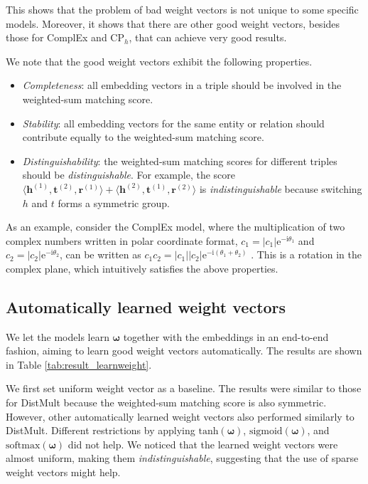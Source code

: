 \documentclass[sigconf,edbt]{acmart-edbt2019}
\def\vh{{\bm{h}}}
\def\vr{{\bm{r}}}
\def\vt{{\bm{t}}}
\begin{document}
This shows that the problem of bad weight vectors is not unique to some specific models. Moreover, it shows that there are other good weight vectors, besides those for ComplEx and CP$ _h $, that can achieve very good results.

We note that the good weight vectors exhibit the following properties.
\begin{itemize}
	\item \textit{Completeness}: all embedding vectors in a triple should be involved in the weighted-sum matching score.
	\item \textit{Stability}: all embedding vectors for the same entity or relation should contribute equally to the weighted-sum matching score.
	\item \textit{Distinguishability}: the weighted-sum matching scores for different triples should be \textit{distinguishable}. For example, the score $ \langle \vh^{(1)}, \vt^{(2)}, \vr^{(1)} \rangle + \langle \vh^{(2)}, \vt^{(1)}, \vr^{(2)} \rangle $ is \textit{indistinguishable} because switching $ h $ and $ t $ forms a symmetric group.
\end{itemize}

As an example, consider the ComplEx model, where the multiplication of two complex numbers written in polar coordinate format, $ c_1 = |c_1|\text{e}^{-\text{i}\theta_1} $ and $ c_2 = |c_2|\text{e}^{-\text{i}\theta_2} $, can be written as $ c_1 c_2 = |c_1||c_2|\text{e}^{-\text{i}(\theta_1 + \theta_2)} $ \cite{ahlfors_complexanalysisintroduction_1953}. This is a rotation in the complex plane, which intuitively satisfies the above properties.

\subsection{Automatically learned weight vectors} 
We let the models learn $ \bm{\omega} $ together with the embeddings in an end-to-end fashion, aiming to learn good weight vectors automatically. The results are shown in Table \ref{tab:result_learnweight}.

We first set uniform weight vector as a baseline. The results were similar to those for DistMult because the weighted-sum matching score is also symmetric. However, other automatically learned weight vectors also performed similarly to DistMult. Different restrictions by applying $ \text{tanh}(\bm{\omega}) $, $ \text{sigmoid}(\bm{\omega}) $, and $ \text{softmax}(\bm{\omega}) $ did not help. We noticed that the learned weight vectors were almost uniform, making them \textit{indistinguishable}, suggesting that the use of sparse weight vectors might help.
\end{document}
